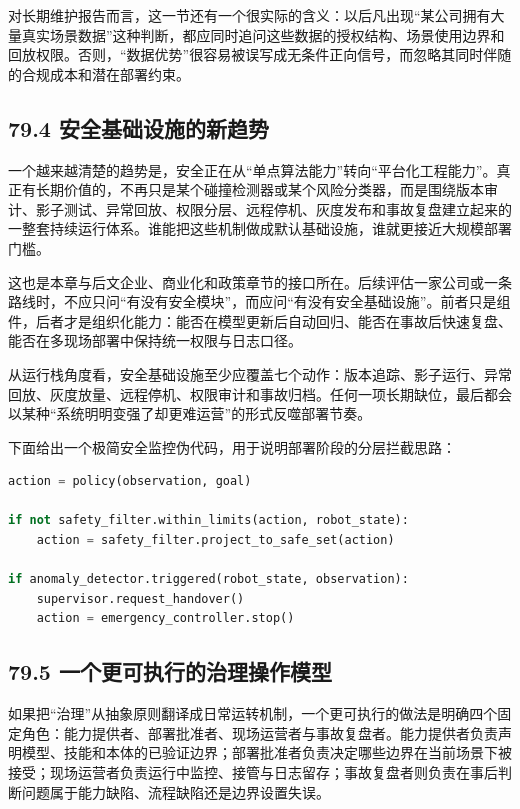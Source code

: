 对长期维护报告而言，这一节还有一个很实际的含义：以后凡出现“某公司拥有大量真实场景数据”这种判断，都应同时追问这些数据的授权结构、场景使用边界和回放权限。否则，“数据优势”很容易被误写成无条件正向信号，而忽略其同时伴随的合规成本和潜在部署约束。

\subsection*{79.4 安全基础设施的新趋势}


一个越来越清楚的趋势是，安全正在从“单点算法能力”转向“平台化工程能力”。真正有长期价值的，不再只是某个碰撞检测器或某个风险分类器，而是围绕版本审计、影子测试、异常回放、权限分层、远程停机、灰度发布和事故复盘建立起来的一整套持续运行体系。谁能把这些机制做成默认基础设施，谁就更接近大规模部署门槛。

这也是本章与后文企业、商业化和政策章节的接口所在。后续评估一家公司或一条路线时，不应只问“有没有安全模块”，而应问“有没有安全基础设施”。前者只是组件，后者才是组织化能力：能否在模型更新后自动回归、能否在事故后快速复盘、能否在多现场部署中保持统一权限与日志口径。

从运行栈角度看，安全基础设施至少应覆盖七个动作：版本追踪、影子运行、异常回放、灰度放量、远程停机、权限审计和事故归档。任何一项长期缺位，最后都会以某种“系统明明变强了却更难运营”的形式反噬部署节奏。

下面给出一个极简安全监控伪代码，用于说明部署阶段的分层拦截思路：

\begin{lstlisting}[language=python]
action = policy(observation, goal)

if not safety_filter.within_limits(action, robot_state):
    action = safety_filter.project_to_safe_set(action)

if anomaly_detector.triggered(robot_state, observation):
    supervisor.request_handover()
    action = emergency_controller.stop()
\end{lstlisting}

\subsection*{79.5 一个更可执行的治理操作模型}


如果把“治理”从抽象原则翻译成日常运转机制，一个更可执行的做法是明确四个固定角色：能力提供者、部署批准者、现场运营者与事故复盘者。能力提供者负责声明模型、技能和本体的已验证边界；部署批准者负责决定哪些边界在当前场景下被接受；现场运营者负责运行中监控、接管与日志留存；事故复盘者则负责在事后判断问题属于能力缺陷、流程缺陷还是边界设置失误。

